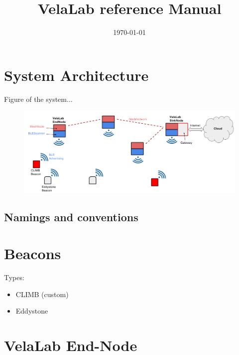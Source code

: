 \documentclass[12pt]{article}
\title{VelaLab reference Manual}
\date{\today}
\begin{document}
\maketitle




\section{System Architecture}

Figure of the system... 

\begin{figure}[h]
	\centering
	\includegraphics[width=0.98\columnwidth]{fig/Architecture.png}
	\caption{}
	\label{fig:system}
\end{figure}



\subsection{Namings and conventions}



\section{Beacons}

Types:
\begin{itemize}
\item{CLIMB (custom)}
\item{Eddystone}
\end{itemize}




\section{VelaLab End-Node}
\end{document}
